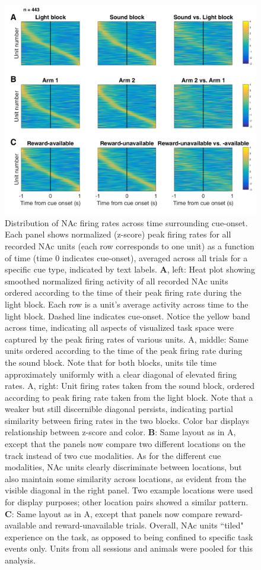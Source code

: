 \documentclass[11pt]{article}
\newcommand{\bsf}[1]{\textbf{#1}}
\begin{document}
 \begin{figure}[ht!]
\centering
\includegraphics[width=\textwidth]{Fig 6 - Task tiling.pdf}
\caption{Distribution of NAc firing rates across time surrounding cue-onset. Each panel shows normalized (z-score) peak firing rates for all recorded NAc
units (each row corresponds to one unit) as a function of time (time 0
indicates cue-onset), averaged across all trials for a specific cue type,
indicated by text labels. \bsf{A}, left: Heat plot showing smoothed normalized firing
activity of all recorded NAc units ordered according to the time of their peak
firing rate during the light block. Each row is a unit’s average activity
across time to the light block. Dashed line indicates cue-onset. Notice the
yellow band across time, indicating all aspects of visualized task space were
captured by the peak firing rates of various units. A, middle: Same units
ordered according to the time of the peak firing rate during the sound
block. Note that for both blocks, units tile time approximately uniformly with
a clear diagonal of elevated firing rates. A, right: Unit firing rates
taken from the sound block, ordered according to peak firing rate taken from
the light block. Note that a weaker but still discernible diagonal persists,
indicating partial similarity between firing rates in the two blocks. Color bar displays relationship between z-score and color. \bsf{B}: Same layout as in
A, except that the panels now compare two different locations on the track
instead of two cue modalities. As for the different cue modalities, NAc units
clearly discriminate between locations, but also maintain some similarity
across locations, as evident from the visible diagonal in the right panel. Two
example locations were used for display purposes; other location pairs showed
a similar pattern. \bsf{C}: Same layout as in A, except that panels now
compare reward-available and reward-unavailable trials. Overall, NAc units
``tiled" experience on the task, as opposed to being confined to specific task
events only. Units from all sessions and animals were pooled for this
analysis.}
\label{fig:tiling}
\end{figure} \clearpage
\end{document}
